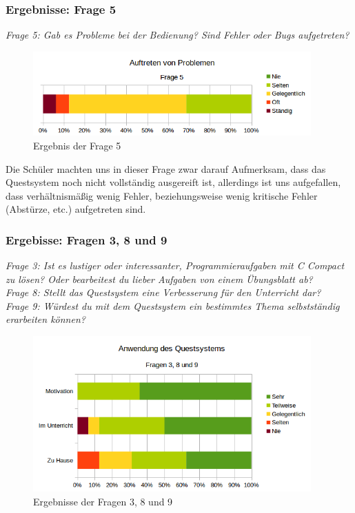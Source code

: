 \newpage
\subsubsection*{Ergebnisse: Frage 5}

\emph{Frage 5: Gab es Probleme bei der Bedienung? Sind Fehler oder Bugs aufgetreten?}

\begin{figure}[h!]
\centering
\includegraphics[width=0.95\textwidth]{./media/images/gui/trials/quest-f5.png}
\caption{Ergebnis der Frage 5}
\end{figure}

Die Schüler machten uns in dieser Frage zwar darauf Aufmerksam, dass das Questsystem noch nicht vollständig ausgereift ist, allerdings ist uns aufgefallen, dass verhältnismäßig wenig Fehler, beziehungsweise wenig kritische Fehler (Abstürze, etc.) aufgetreten sind.

\subsubsection*{Ergebisse: Fragen 3, 8 und 9}

\emph{Frage 3: Ist es lustiger oder interessanter, Programmieraufgaben mit C Compact zu lösen?
Oder bearbeitest du lieber Aufgaben von einem Übungsblatt ab? \\
Frage 8: Stellt das Questsystem eine Verbesserung für den Unterricht dar? \\
Frage 9: Würdest du mit dem Questsystem ein bestimmtes Thema selbstständig erarbeiten können?}

\begin{figure}[h!]
\centering
\includegraphics[width=0.95\textwidth]{./media/images/gui/trials/quest-f3-8-9.png}
\caption{Ergebnisse der Fragen 3, 8 und 9}
\label{fig:sci-quest-f3-8-9}
\end{figure}


